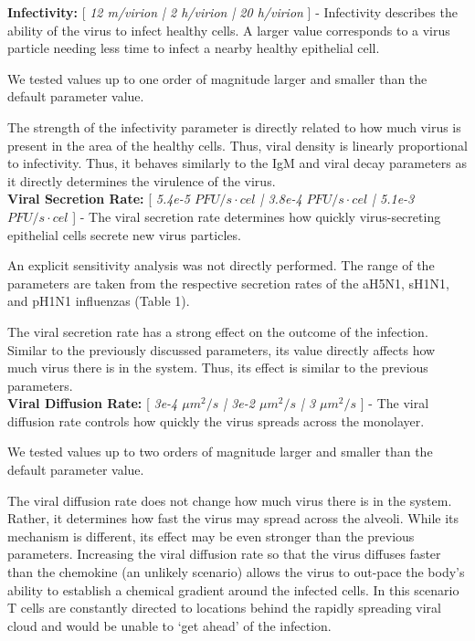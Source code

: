 \documentclass[10pt]{article}
\begin{document}
\textbf{Infectivity:} [ \textit{12 m/virion | 2 h/virion | 20 h/virion} ] - Infectivity describes the ability of the virus to infect healthy cells.  A larger value corresponds to a virus particle needing less time to infect a nearby healthy epithelial cell.

We tested values up to one order of magnitude larger and smaller than the default parameter value.

The strength of the infectivity parameter is directly related to how much virus is present in the area of the healthy cells.  Thus, viral density is linearly proportional to infectivity.  Thus, it behaves similarly to the IgM and viral decay parameters as it directly determines the virulence of the virus. \\


\textbf{Viral Secretion Rate:} [ \textit{5.4e-5 $PFU/s\cdot cel$ | 3.8e-4 $PFU/s\cdot cel$ | 5.1e-3 $PFU/s\cdot cel$} ] - The viral secretion rate determines how quickly virus-secreting epithelial cells secrete new virus particles.

An explicit sensitivity analysis was not directly performed.  The range of the parameters are taken from the respective secretion rates of the aH5N1, sH1N1, and pH1N1 influenzas (Table 1).

The viral secretion rate has a strong effect on the outcome of the infection.  Similar to the previously discussed parameters, its value directly affects how much virus there is in the system.  Thus, its effect is similar to the previous parameters. \\


\textbf{Viral Diffusion Rate:} [ \textit{3e-4 $\mu m^2/s$ | 3e-2 $\mu m^2/s$ | 3 $\mu m^2/s$} ] - The viral diffusion rate controls how quickly the virus spreads across the monolayer.

We tested values up to two orders of magnitude larger and smaller than the default parameter value.

The viral diffusion rate does not change how much virus there is in the system.  Rather, it determines how fast the virus may spread across the alveoli.  While its mechanism is different, its effect may be even stronger than the previous parameters.  Increasing the viral diffusion rate so that the virus diffuses faster than the chemokine (an unlikely scenario) allows the virus to out-pace the body's ability to establish a chemical gradient around the infected cells.  In this scenario T cells are constantly directed to locations behind the rapidly spreading viral cloud and would be unable to `get ahead' of the infection. \\
\end{document}
